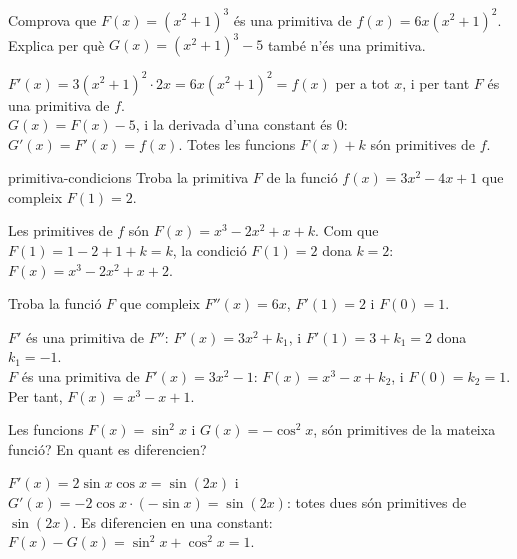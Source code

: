 \begin{apartats}

Comprova que $F(x)=(x^2+1)^3$ és una primitiva de $f(x)=6x(x^2+1)^2$. Explica per què
$G(x)=(x^2+1)^3-5$ també n'és una primitiva.

\begin{solucio}
$F'(x)=3(x^2+1)^2\cdot2x=6x(x^2+1)^2=f(x)$ per a tot $x$, i per tant $F$ és una primitiva de $f$.\\
$G(x)=F(x)-5$, i la derivada d'una constant és 0: $G'(x)=F'(x)=f(x)$. Totes les funcions $F(x)+k$ són
primitives de $f$.
\end{solucio}

\begin{tria}{primitiva-condicions}
Troba la primitiva $F$ de la funció $f(x)=3x^2-4x+1$ que compleix $F(1)=2$.

\begin{solucio}
Les primitives de $f$ són $F(x)=x^3-2x^2+x+k$. Com que $F(1)=1-2+1+k=k$, la condició $F(1)=2$ dona
$k=2$: $F(x)=x^3-2x^2+x+2$.
\end{solucio}

Troba la funció $F$ que compleix $F''(x)=6x$, $F'(1)=2$ i $F(0)=1$.

\begin{solucio}
$F'$ és una primitiva de $F''$: $F'(x)=3x^2+k_1$, i $F'(1)=3+k_1=2$ dona $k_1=-1$.\\
$F$ és una primitiva de $F'(x)=3x^2-1$: $F(x)=x^3-x+k_2$, i $F(0)=k_2=1$. Per tant, $F(x)=x^3-x+1$.
\end{solucio}
\end{tria}

\begin{nomesllarg}
Les funcions $F(x)=\sin^2x$ i $G(x)=-\cos^2x$, són primitives de la mateixa funció? En quant es
diferencien?

\begin{solucio}
$F'(x)=2\sin x\cos x=\sin(2x)$ i $G'(x)=-2\cos x\cdot(-\sin x)=\sin(2x)$: totes dues són primitives de
$\sin(2x)$. Es diferencien en una constant: $F(x)-G(x)=\sin^2x+\cos^2x=1$.
\end{solucio}
\end{nomesllarg}

\end{apartats}
